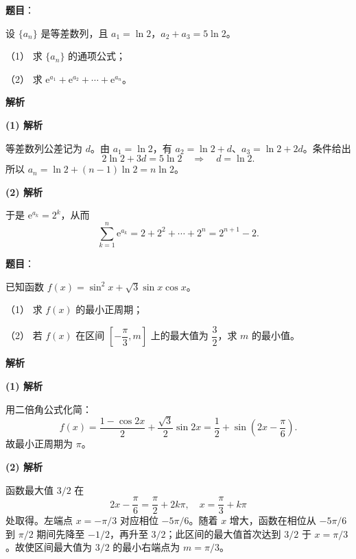 \begin{answer}

\textbf{题目}：

设 $\{a_n\}$ 是等差数列，且 $a_1=\ln2$，$a_2+a_3=5\ln2$。

（1） 求 $\{a_n\}$ 的通项公式；

（2） 求 $\mathrm e^{a_1}+\mathrm e^{a_2}+\cdots+\mathrm e^{a_n}$。

\textbf{解析}

\textbf{(1) 解析}

等差数列公差记为 $d$。由 $a_1=\ln2$，有 $a_2=\ln2+d$、$a_3=\ln2+2d$。条件给出
\nopagebreak[4]
\[
2\ln2+3d=5\ln2\quad\Longrightarrow\quad d=\ln2.
\]
所以 $a_n=\ln2+(n-1)\ln2=n\ln2$。

\textbf{(2) 解析}

于是 $\mathrm e^{a_k}=2^k$，从而
\nopagebreak[4]
\[
\sum_{k=1}^n\mathrm e^{a_k}=2+2^2+\cdots+2^n=2^{n+1}-2.
\]



\end{answer}
\begin{answer}

\textbf{题目}：

已知函数 $f(x)=\sin^2x+\sqrt3\sin x\cos x$。

（1） 求 $f(x)$ 的最小正周期；

（2） 若 $f(x)$ 在区间 $\left[-\dfrac\pi3,m\right]$ 上的最大值为 $\dfrac32$，求 $m$ 的最小值。

\textbf{解析}

\textbf{(1) 解析}

用二倍角公式化简：
\nopagebreak[4]
\[
f(x)=\frac{1-\cos2x}{2}+\frac{\sqrt3}{2}\sin2x
=\frac12+\sin\left(2x-\frac\pi6\right).
\]
故最小正周期为 $\pi$。

\textbf{(2) 解析}

函数最大值 $3/2$ 在
\nopagebreak[4]
\[
2x-\frac\pi6=\frac\pi2+2k\pi,
\quad x=\frac\pi3+k\pi
\]
处取得。左端点 $x=-\pi/3$ 对应相位 $-5\pi/6$。随着 $x$ 增大，函数在相位从 $-5\pi/6$ 到 $\pi/2$ 期间先降至 $-1/2$，再升至 $3/2$；此区间的最大值首次达到 $3/2$ 于 $x=\pi/3$。故使区间最大值为 $3/2$ 的最小右端点为 $m=\pi/3$。



\end{answer}
